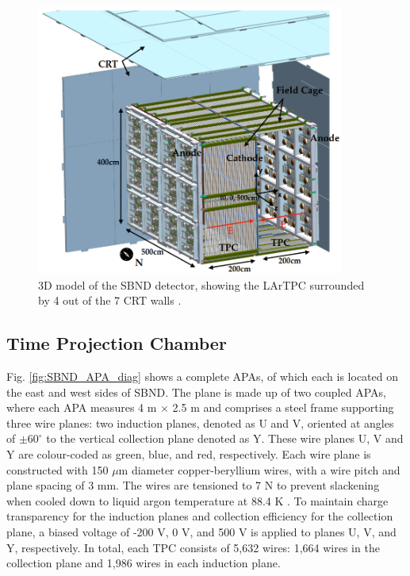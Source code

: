 \begin{figure}[htbp] 
\centering    
\includegraphics[width=0.9\textwidth]{SBND_Pretty}
\caption[Short-Baseline Near Detector 3D Model]{
3D model of the SBND detector, showing the LArTPC surrounded by 4 out of the 7 CRT walls \cite{sbnd_pds_paper}. 
}
\label{fig:SBND_Pretty}
\end{figure}

\subsection{Time Projection Chamber}

Fig. \ref{fig:SBND_APA_diag} shows a complete APAs, of which each is located on the east and west sides of SBND.
The plane is made up of two coupled APAs, where each APA measures 4 m $\times$ 2.5 m and comprises a steel frame supporting three wire planes: two induction planes, denoted as U and V, oriented at angles of $\pm 60^{\circ}$ to the vertical collection plane denoted as Y. 
These wire planes U, V and Y are colour-coded as green, blue, and red, respectively.
Each wire plane is constructed with 150 $\mu$m diameter copper-beryllium wires, with a wire pitch and plane spacing of 3 mm. 
The wires are tensioned to 7 N to prevent slackening when cooled down to liquid argon temperature at 88.4 K \cite{SBND_Wires}.
To maintain charge transparency for the induction planes and collection efficiency for the collection plane, a biased voltage of -200 V, 0 V, and 500 V is applied to planes U, V, and Y, respectively.
In total, each TPC consists of 5,632 wires: 1,664 wires in the collection plane and 1,986 wires in each induction plane.

